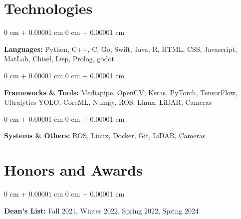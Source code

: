 \documentclass[10pt, letterpaper]{article}
\newenvironment{onecolentry}{
    \begin{adjustwidth}{
        0 cm + 0.00001 cm
    }{
        0 cm + 0.00001 cm
    }
}{
    \end{adjustwidth}
} %
\begin{document}
    
    \section{Technologies}



        
        \begin{onecolentry}
            \textbf{Languages:} Python, C++, C, Go, Swift, Java, R, HTML, CSS, Javascript, MatLab, Chisel, Lisp, Prolog, godot 
        \end{onecolentry}

        \vspace{0.2 cm}

        \begin{onecolentry}
            \textbf{Frameworks \& Tools:} Mediapipe, OpenCV, Keras, PyTorch, TensorFlow, Ultralytics YOLO, CoreML, Numpy, ROS, Linux, LiDAR, Cameras 
        \end{onecolentry}

        \vspace{0.2 cm}

        \begin{onecolentry}
            \textbf{Systems \& Others:} ROS, Linux, Docker, Git, LiDAR, Cameras 
        \end{onecolentry}

    \section{Honors and Awards}
        \begin{onecolentry}
            \textbf{Dean's List: } Fall 2021, Winter 2022, Spring 2022, Spring 2024
        \end{onecolentry}


    
\end{document}
